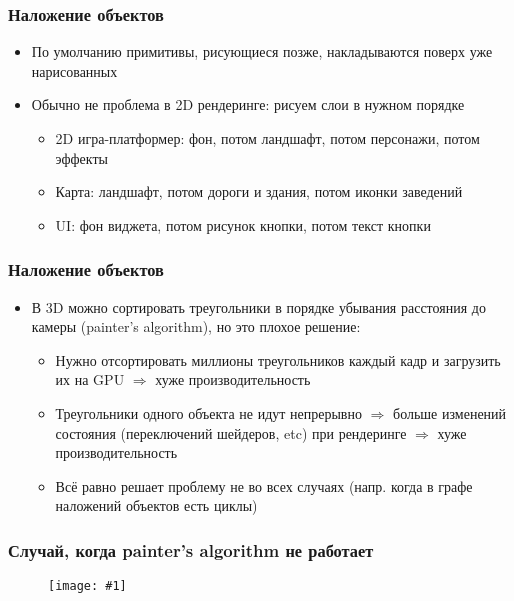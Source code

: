 \documentclass[10pt]{beamer}
\newcommand{\slideimage}[1]{
  \begin{figure}
    \begin{adjustbox}{width=\textwidth, totalheight=\textheight-2\baselineskip-2\baselineskip,keepaspectratio}
      \texttt{[image: \#1]}
    \end{adjustbox}
  \end{figure}
}
\begin{document}
\begin{frame}[fragile]
\frametitle{Наложение объектов}
\begin{itemize}
\item По умолчанию примитивы, рисующиеся позже, накладываются поверх уже нарисованных
\pause
\item Обычно не проблема в 2D рендеринге: рисуем слои в нужном порядке
\pause
\begin{itemize}
\item 2D игра-платформер: фон, потом ландшафт, потом персонажи, потом эффекты
\pause
\item Карта: ландшафт, потом дороги и здания, потом иконки заведений
\pause
\item UI: фон виджета, потом рисунок кнопки, потом текст кнопки
\end{itemize}
\end{itemize}
\end{frame}

\begin{frame}[fragile]
\frametitle{Наложение объектов}
\begin{itemize}
\item В 3D можно сортировать треугольники в порядке убывания расстояния до камеры (painter's algorithm), но это плохое решение:
\pause
\begin{itemize}
\item Нужно отсортировать миллионы треугольников каждый кадр и загрузить их на GPU \begin{math}\Longrightarrow\end{math} хуже производительность
\pause
\item Треугольники одного объекта не идут непрерывно \begin{math}\Longrightarrow\end{math} больше изменений состояния (переключений шейдеров, etc) при рендеринге \begin{math}\Longrightarrow\end{math} хуже производительность
\pause
\item Всё равно решает проблему не во всех случаях (напр. когда в графе наложений объектов есть циклы)
\end{itemize}
\end{itemize}
\end{frame}

\begin{frame}[fragile]
\frametitle{Случай, когда painter's algorithm не работает}
\slideimage{painters-fail.png}
\end{frame}
\end{document}
